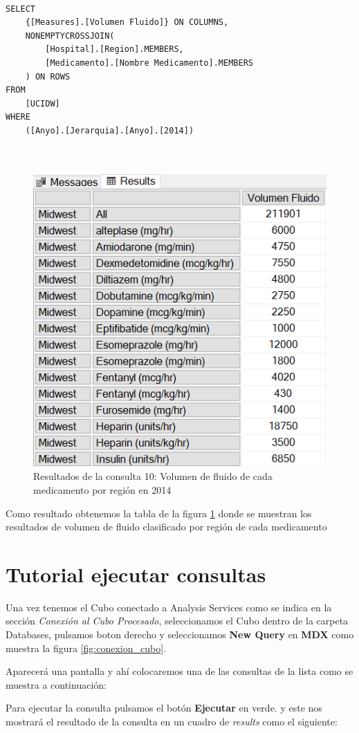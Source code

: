 \documentclass{article}
\begin{document}
\begin{lstlisting}[style=ddlstyle, label=lst:consulta10,caption=Consulta 10: Volumen de fluido de cada medicamento por region en 2014]
	
SELECT 
	{[Measures].[Volumen Fluido]} ON COLUMNS, 
	NONEMPTYCROSSJOIN(
		[Hospital].[Region].MEMBERS, 
		[Medicamento].[Nombre Medicamento].MEMBERS
	) ON ROWS
FROM 
	[UCIDW]
WHERE 
	([Anyo].[Jerarquia].[Anyo].[2014])

	
\end{lstlisting}


\begin{figure}[H]
	\centering
	\includegraphics[width=0.4\linewidth]{images/consulta10.png}
	\caption{Resultados de la consulta 10: Volumen de fluido de cada medicamento por región en 2014}
	\label{fig:consulta10}
\end{figure}

Como resultado obtenemos la tabla de la figura \ref{fig:consulta10} donde se muestran los resultados de volumen de fluido clasificado por región de cada medicamento

\section{Tutorial ejecutar consultas}


	 Una vez tenemos el Cubo conectado a Analysis Services como se indica en la sección \textit{Conexión al Cubo Procesado}, seleccionamos el Cubo dentro de la carpeta Databases, pulsamos boton derecho y seleccionamos \textbf{New Query} en \textbf{MDX} como muestra la figura \ref{fig:conexion_cubo}.
	 
	 Aparecerá una pantalla y ahí colocaremos una de las consultas de la lista como se muestra a continuación: 
	 
	 Para ejecutar la consulta pulsamos el botón \textbf{Ejecutar} en verde. y este nos mostrará el resultado de la consulta en un cuadro de \textit{results} como el siguiente: 
	 
\end{document}
